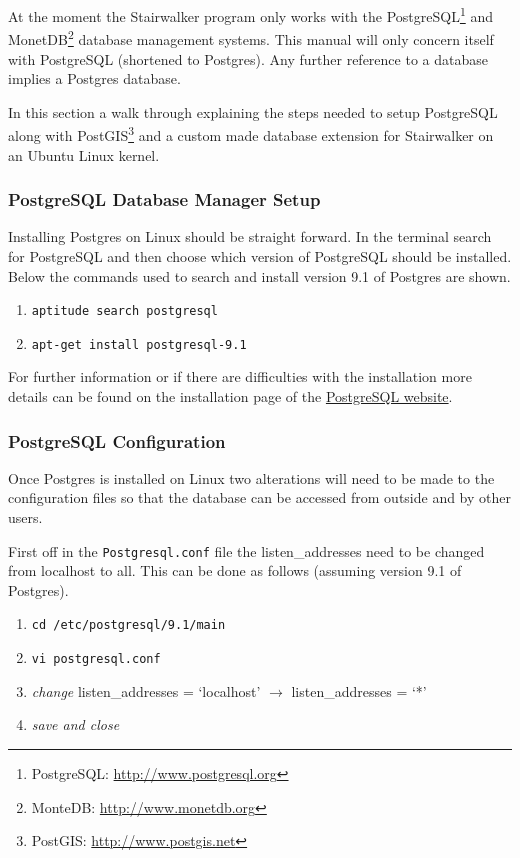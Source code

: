 At the moment the Stairwalker program only works with the PostgreSQL\footnote{PostgreSQL: \url{http://www.postgresql.org}} and MonetDB\footnote{MonteDB: \url{http://www.monetdb.org}} database management systems. This manual will only concern itself with PostgreSQL (shortened to Postgres). Any further reference to a database implies a Postgres database.

In this section a walk through explaining the steps needed to setup PostgreSQL along with PostGIS\footnote{PostGIS: \url{http://www.postgis.net}} and a custom made database extension for Stairwalker on an Ubuntu Linux kernel.

\subsubsection{PostgreSQL Database Manager Setup}

\label{sec:postgresql}
Installing Postgres on Linux should be straight forward. In the terminal search for PostgreSQL and then choose which version of PostgreSQL should be installed. Below the commands used to search and install version 9.1 of Postgres are shown.

\begin{enumerate}
	\item \lstinline|aptitude search postgresql|
	\item \lstinline|apt-get install postgresql-9.1|
\end{enumerate}
For further information or if there are difficulties with the installation more details can be found on the installation page of the \href{http://www.postgresql.org/download/}{PostgreSQL website}.  

\subsubsection{PostgreSQL Configuration}
Once Postgres is installed on Linux two alterations will need to be made to the configuration files so that the database can be accessed from outside and by other users.

First off in the \lstinline|Postgresql.conf| file the listen\_addresses need to be changed from localhost to all. This can be done as follows (assuming version 9.1 of Postgres).

\begin{enumerate}
	\item \lstinline|cd /etc/postgresql/9.1/main|
	\item \lstinline|vi postgresql.conf|
	\item \textit{change} listen\_addresses = `localhost' $\rightarrow$ listen\_addresses = `*'
	\item \textit{save and close}
\end{enumerate}

